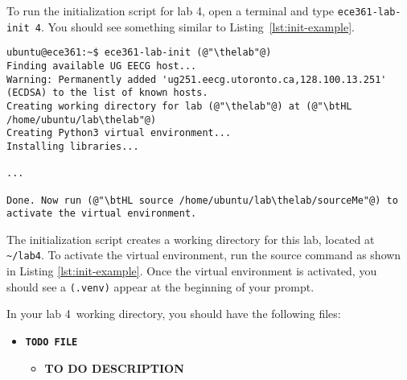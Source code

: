 \documentclass[11pt]{article}
\def\thelab{4}
\begin{document}

To run the initialization script for lab \thelab, open a terminal and type \texttt{ece361-lab-init \thelab}.
You should see something similar to Listing~\ref{lst:init-example}.

\begin{lstlisting}[style=ece361shell, caption={Initializing lab \thelab.}, label={lst:init-example}]
ubuntu@ece361:~$ ece361-lab-init (@"\thelab"@)
Finding available UG EECG host...
Warning: Permanently added 'ug251.eecg.utoronto.ca,128.100.13.251' (ECDSA) to the list of known hosts.
Creating working directory for lab (@"\thelab"@) at (@"\btHL /home/ubuntu/lab\thelab"@)
Creating Python3 virtual environment...
Installing libraries...

...

Done. Now run (@"\btHL source /home/ubuntu/lab\thelab/sourceMe"@) to activate the virtual environment.
\end{lstlisting}

The initialization script creates a working directory for this lab, located at \texttt{\textasciitilde/lab\thelab}.
To activate the virtual environment, run the source command as shown in Listing \ref{lst:init-example}.
Once the virtual environment is activated, you should see a \texttt{(.venv)} appear at the beginning of your prompt.



In your lab \thelab~working directory, you should have the following files:
\begin{itemize}
	\item \texttt{\textbf{TODO FILE}}
        \begin{itemize}
            \item \textbf{TO DO DESCRIPTION}
        \end{itemize}
\end{itemize}



\end{document}
